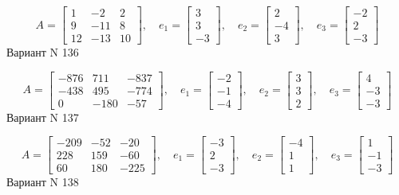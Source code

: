 \documentclass[11pt]{report}
\begin{document}
$$A = \left[\begin{matrix}1 & -2 & 2\\9 & -11 & 8\\12 & -13 & 10\end{matrix}\right],\quad e_1 = \left[\begin{matrix}3\\3\\-3\end{matrix}\right],\quad e_2 = \left[\begin{matrix}2\\-4\\3\end{matrix}\right],\quad e_3 = \left[\begin{matrix}-2\\2\\-3\end{matrix}\right]$$Вариант N 136

$$A = \left[\begin{matrix}-876 & 711 & -837\\-438 & 495 & -774\\0 & -180 & -57\end{matrix}\right],\quad e_1 = \left[\begin{matrix}-2\\-1\\-4\end{matrix}\right],\quad e_2 = \left[\begin{matrix}3\\3\\2\end{matrix}\right],\quad e_3 = \left[\begin{matrix}4\\-3\\-3\end{matrix}\right]$$Вариант N 137

$$A = \left[\begin{matrix}-209 & -52 & -20\\228 & 159 & -60\\60 & 180 & -225\end{matrix}\right],\quad e_1 = \left[\begin{matrix}-3\\2\\-3\end{matrix}\right],\quad e_2 = \left[\begin{matrix}-4\\1\\1\end{matrix}\right],\quad e_3 = \left[\begin{matrix}1\\-1\\-3\end{matrix}\right]$$Вариант N 138
\end{document}
